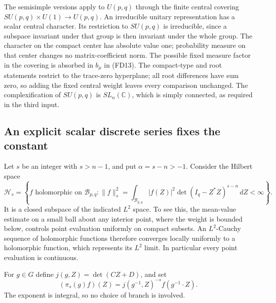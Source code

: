 The semisimple versions apply to $U(p,q)$ through the
finite central covering $SU(p,q)\times U(1)\to U(p,q)$.
An irreducible unitary representation has a scalar
central character. Its restriction to $SU(p,q)$ is
irreducible, since a subspace invariant under that group
is then invariant under the whole group.
The character on the compact center has absolute value one;
probability measure on that center changes no
matrix-coefficient norm. The possible fixed measure factor
in the covering is absorbed in $b_\mu$ in (FD13).
The compact-type and root statements restrict to the
trace-zero hyperplane; all root differences have sum zero,
so adding the fixed central weight leaves every comparison
unchanged. The complexification of $SU(p,q)$ is $SL_n(\mathbb C)$,
which is simply connected, as required in the third input.

\subsection{An explicit scalar discrete series fixes the constant}

Let $s$ be an integer with $s>n-1$, and put
$\alpha=s-n>-1$. Consider the Hilbert space
\[
 \mathcal H_s=\left\{f\text{ holomorphic on }\mathcal B_{p,q}:
        \|f\|_s^2=
         \int_{\mathcal B_{p,q}}|f(Z)|^2
                         \det(I_q-Z^*Z)^{s-n}\,dZ<\infty\right\}.
 \tag{FD15}
\]
It is a closed subspace of the indicated $L^2$ space.
To see this, the mean-value estimate on a small ball about
any interior point, where the weight is bounded below,
controls point evaluation uniformly on compact subsets.
An $L^2$-Cauchy sequence of holomorphic functions therefore
converges locally uniformly to a holomorphic function,
which represents its $L^2$ limit. In particular every
point evaluation is continuous.

For $g\in G$ define $j(g,Z)=\det(CZ+D)$, and set
\[
       (\pi_s(g)f)(Z)=j(g^{-1},Z)^{-s}f(g^{-1}\cdot Z).
 \tag{FD16}
\]
The exponent is integral, so no choice of branch is involved.

